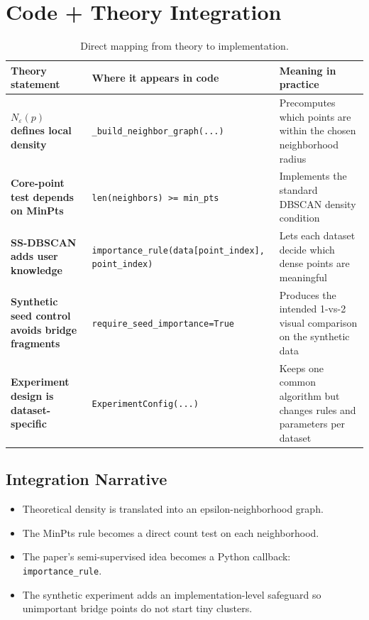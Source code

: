 \documentclass[11pt,a4paper]{article}
\begin{document}
\section{Code + Theory Integration}

\begin{table}[H]
\centering
\small
\begin{tabularx}{\textwidth}{>{\bfseries}lYY}
\toprule
Theory statement & Where it appears in code & Meaning in practice \\
\midrule
$N_{\varepsilon}(p)$ defines local density & \texttt{\_build\_neighbor\_graph(...)} & Precomputes which points are within the chosen neighborhood radius \\
Core-point test depends on MinPts & \texttt{len(neighbors) >= min\_pts} & Implements the standard DBSCAN density condition \\
SS-DBSCAN adds user knowledge & \texttt{importance\_rule(data[point\_index], point\_index)} & Lets each dataset decide which dense points are meaningful \\
Synthetic seed control avoids bridge fragments & \texttt{require\_seed\_importance=True} & Produces the intended 1-vs-2 visual comparison on the synthetic data \\
Experiment design is dataset-specific & \texttt{ExperimentConfig(...)} & Keeps one common algorithm but changes rules and parameters per dataset \\
\bottomrule
\end{tabularx}
\caption{Direct mapping from theory to implementation.}
\end{table}

\subsection{Integration Narrative}

\begin{itemize}
\item Theoretical density is translated into an epsilon-neighborhood graph.
\item The MinPts rule becomes a direct count test on each neighborhood.
\item The paper's semi-supervised idea becomes a Python callback:
\texttt{importance\_rule}.
\item The synthetic experiment adds an implementation-level safeguard so
unimportant bridge points do not start tiny clusters.
\end{itemize}
\end{document}
